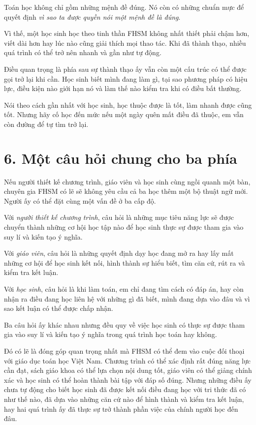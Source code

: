 Toán học không chỉ gồm những mệnh đề đúng. Nó còn có những chuẩn mực để quyết định \emph{vì sao ta được quyền nói một mệnh đề là đúng}.

Vì thế, một học sinh học theo tinh thần FHSM không nhất thiết phải chậm hơn, viết dài hơn hay lúc nào cũng giải thích mọi thao tác. Khi đã thành thạo, nhiều quá trình có thể trở nên nhanh và gần như tự động.

Điều quan trọng là phía sau sự thành thạo ấy vẫn còn một cấu trúc có thể được gọi trở lại khi cần. Học sinh biết mình đang làm gì, tại sao phương pháp có hiệu lực, điều kiện nào giới hạn nó và làm thế nào kiểm tra khi có điều bất thường.

Nói theo cách gần nhất với học sinh, học thuộc được là tốt, làm nhanh được cũng tốt. Nhưng hãy cố học đến mức nếu một ngày quên mất điều đã thuộc, em vẫn còn đường để tự tìm trở lại.

\section*{6. Một câu hỏi chung cho ba phía}

Nếu người thiết kế chương trình, giáo viên và học sinh cùng ngồi quanh một bàn, chuyên gia FHSM có lẽ sẽ không yêu cầu cả ba học thêm một bộ thuật ngữ mới. Người ấy có thể đặt cùng một vấn đề ở ba cấp độ.

Với \emph{người thiết kế chương trình}, câu hỏi là những mục tiêu năng lực sẽ được chuyển thành những cơ hội học tập nào để học sinh thực sự được tham gia vào suy lí và kiến tạo ý nghĩa.

Với \emph{giáo viên}, câu hỏi là những quyết định dạy học đang mở ra hay lấy mất những cơ hội để học sinh kết nối, hình thành sự hiểu biết, tìm căn cứ, rút ra và kiểm tra kết luận.

Với \emph{học sinh}, câu hỏi là khi làm toán, em chỉ đang tìm cách có đáp án, hay còn nhận ra điều đang học liên hệ với những gì đã biết, mình đang dựa vào đâu và vì sao kết luận có thể được chấp nhận.

Ba câu hỏi ấy khác nhau nhưng đều quy về việc học sinh có thực sự được tham gia vào suy lí và kiến tạo ý nghĩa trong quá trình học toán hay không.

Đó có lẽ là đóng góp quan trọng nhất mà FHSM có thể đem vào cuộc đối thoại với giáo dục toán học Việt Nam. Chương trình có thể xác định rất đúng năng lực cần đạt, sách giáo khoa có thể lựa chọn nội dung tốt, giáo viên có thể giảng chính xác và học sinh có thể hoàn thành bài tập với đáp số đúng. Nhưng những điều ấy chưa tự động cho biết học sinh đã được kết nối điều đang học với tri thức đã có như thế nào, đã dựa vào những căn cứ nào để hình thành và kiểm tra kết luận, hay hai quá trình ấy đã thực sự trở thành phần việc của chính người học đến đâu.

